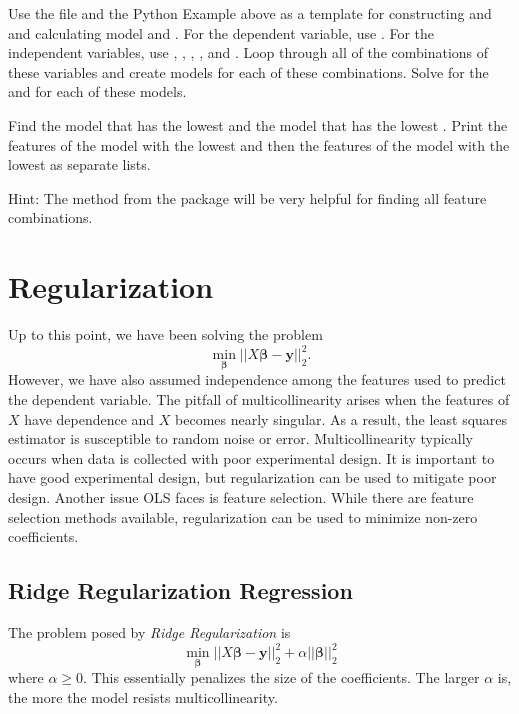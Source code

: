 \begin{problem}
Use the file  and the Python Example above as a template for constructing  and  and calculating model  and .
For the dependent variable, use .
For the independent variables, use , , , , and .
Loop through all of the combinations of these variables and create  models for each of these combinations.
Solve for the  and  for each of these models.

Find the model that has the lowest  and the model that has the lowest .
Print the features of the model with the lowest  and then the features of the model with the lowest  as separate lists.

Hint: The  method from the  package will be very helpful for finding all feature combinations.
\label{prob:feature-selection}
\end{problem}

\section*{Regularization}
Up to this point, we have been solving the problem \[ \min_{\boldsymbol\beta} \vert\vert X\boldsymbol\beta - \boldsymbol y \vert\vert_2^2. \]
However, we have also assumed independence among the features used to predict the dependent variable.
The pitfall of multicollinearity arises when the features of $X$ have dependence and $X$ becomes nearly singular.
As a result, the least squares estimator is susceptible to random noise or error.
Multicollinearity typically occurs when data is collected with poor experimental design.
It is important to have good experimental design, but regularization can be used to mitigate poor design.
Another issue OLS faces is feature selection.
While there are feature selection methods available, regularization can be used to minimize non-zero coefficients.

\subsection*{Ridge Regularization Regression}
The problem posed by \textit{Ridge Regularization} is \[ \min_{\boldsymbol\beta} \vert\vert X\boldsymbol\beta - \boldsymbol y \vert\vert_2^2 + \alpha \vert\vert \boldsymbol\beta \vert\vert_2^2 \]
where $\alpha \geq 0$. This essentially penalizes the size of the coefficients.
The larger $\alpha$ is, the more the model resists multicollinearity.

